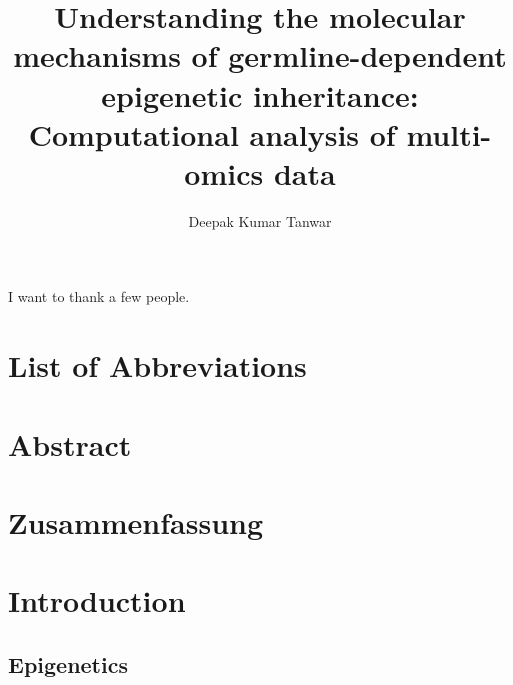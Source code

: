 \documentclass[12pt,twoside]{reedthesis}
\title{Understanding the molecular mechanisms of germline-dependent epigenetic inheritance: Computational analysis of multi-omics data}
\author{Deepak Kumar Tanwar}
\date{}
\begin{document}
  \maketitle

\frontmatter %
\pagestyle{empty} %
  \begin{acknowledgements}
    I want to thank a few people.
  \end{acknowledgements}

  \hypersetup{linkcolor=black}
  \setcounter{secnumdepth}{2}
  \setcounter{tocdepth}{2}
  \tableofcontents

  \listoftables

  \listoffigures



\mainmatter %
\pagestyle{fancyplain} %

\hypertarget{list-of-abbreviations}{%
\chapter*{List of Abbreviations}\label{list-of-abbreviations}}
\begin{acronym}[MPC]
\end{acronym}
\hypertarget{abstract}{%
\chapter*{Abstract}\label{abstract}}

\hypertarget{abstract-de}{%
\chapter*{Zusammenfassung}\label{abstract-de}}

\hypertarget{intro}{%
\chapter*{Introduction}\label{intro}}

\hypertarget{epigenetics}{%
\section{Epigenetics}\label{epigenetics}}
\end{document}

